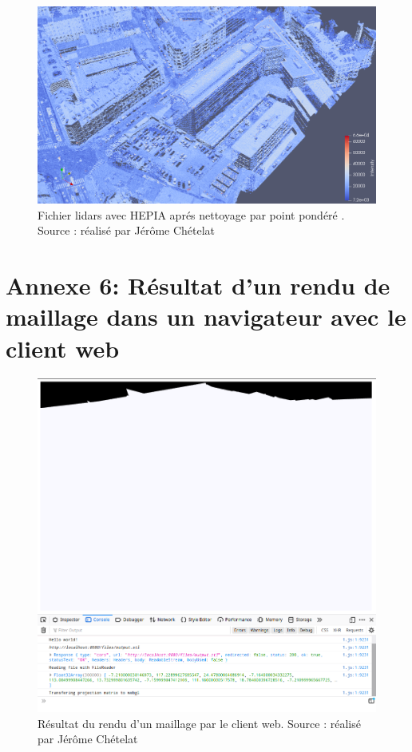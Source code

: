 \begin{figure}[htbp!]
    \centering
	\includegraphics[width=0.9\linewidth]{figures/hepia_las_after_filter_pond.png}
	\caption{Fichier lidars avec HEPIA aprés nettoyage par point pondéré . Source : réalisé par Jérôme Chételat}
	\label{fig:lidar_aft_filt_pond}
\end{figure}

\chapter*{Annexe 6: Résultat d'un rendu de maillage dans un navigateur avec le client web}

\begin{figure}[htbp!]
    \centering
	\includegraphics[width=0.8\linewidth]{figures/web_client.png}
	\caption{Résultat du rendu d'un maillage par le client web. Source : réalisé par Jérôme Chételat}
	\label{fig:web_client}
\end{figure}

\stopcontents[annexes]
\resumecontents[default]
